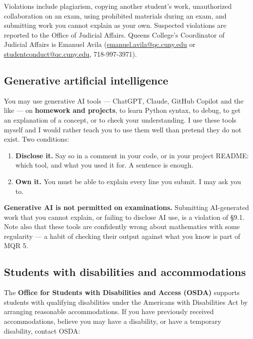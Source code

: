 \documentclass[11pt]{article}
\begin{document}
Violations include plagiarism, copying another student's work, unauthorized
collaboration on an exam, using prohibited materials during an exam, and
submitting work you cannot explain as your own. Suspected violations are
reported to the Office of Judicial Affairs. Queens College's Coordinator of
Judicial Affairs is Emanuel Avila
(\href{mailto:emanuel.avila@qc.cuny.edu}{emanuel.avila@qc.cuny.edu} or
\href{mailto:studentconduct@qc.cuny.edu}{studentconduct@qc.cuny.edu},
718-997-3971).

\subsection{Generative artificial intelligence}

You may use generative AI tools --- ChatGPT, Claude, GitHub Copilot and the like
--- on \textbf{homework and projects}, to learn Python syntax, to debug, to get
an explanation of a concept, or to check your understanding. I use these tools
myself and I would rather teach you to use them well than pretend they do not
exist. Two conditions:

\begin{enumerate}
  \item \textbf{Disclose it.} Say so in a comment in your code, or in your
        project README: which tool, and what you used it for. A sentence is
        enough.
  \item \textbf{Own it.} You must be able to explain every line you submit. I
        may ask you to.
\end{enumerate}

\textbf{Generative AI is not permitted on examinations.} Submitting AI-generated
work that you cannot explain, or failing to disclose AI use, is a violation of
\S9.1. Note also that these tools are confidently wrong about mathematics with
some regularity --- a habit of checking their output against what you know is
part of MQR 5.

\subsection{Students with disabilities and accommodations}

The \textbf{Office for Students with Disabilities and Access (OSDA)} supports
students with qualifying disabilities under the Americans with Disabilities Act
by arranging reasonable accommodations. If you have previously received
accommodations, believe you may have a disability, or have a temporary
disability, contact OSDA:
\end{document}
